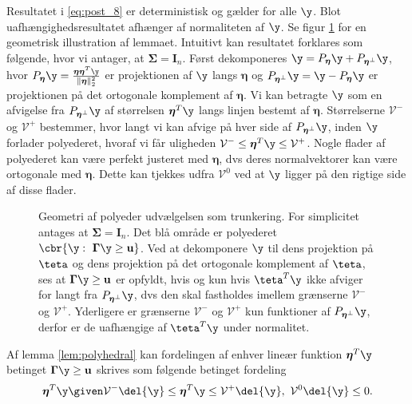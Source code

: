 %
Resultatet i \eqref{eq:post_8} er deterministisk og gælder for alle \(\y\).
Blot uafhængighedsresultatet afhænger af normaliteten af \(\y\).
Se figur \ref{fig:polyhedron} for en geometrisk illustration af lemmaet.
Intuitivt kan resultatet forklares som følgende, hvor vi antager, at \(\boldsymbol{\Sigma}= \mathbf{I}_n\).
Først dekomponeres \(\y=P_{\boldsymbol{\eta}} \y + P_{\boldsymbol{\eta}^\perp} \y\), hvor \(P_{\boldsymbol{\eta}} \y = \frac{\boldsymbol{\eta} \boldsymbol{\eta}^T \y}{\Vert \boldsymbol{\eta} \Vert_2^2}\) er projektionen af \(\y\) langs \(\boldsymbol{\eta}\) og \(P_{\boldsymbol{\eta}^\perp} \y = \y - P_{\boldsymbol{\eta}} \y\) er projektionen på det ortogonale komplement af \(\boldsymbol{\eta}\).
Vi kan betragte \(\y\) som en afvigelse fra \(P_{\boldsymbol{\eta}^\perp} \y\) af størrelsen \(\boldsymbol{\eta}^T \y\) langs linjen bestemt af \(\boldsymbol{\eta}\).
Størrelserne \(\mathcal{V}^-\) og \(\mathcal{V}^+\) bestemmer, hvor langt vi kan afvige på hver side af \(P_{\boldsymbol{\eta}^\perp} \y\), inden \(\y\) forlader polyederet, hvoraf vi får uligheden \(\mathcal{V}^- \leq \boldsymbol{\eta}^T \y \leq \mathcal{V}^+\).
Nogle flader af polyederet kan være perfekt justeret med \(\boldsymbol{\eta}\), dvs deres normalvektorer kan være ortogonale med \(\boldsymbol{\eta}\).
Dette kan tjekkes udfra \(\mathcal{V}^0\) ved at \(\y\) ligger på den rigtige side af disse flader.  
%
\begin{figure}[H]
\centering
\scalebox{1}{}
\caption{Geometri af polyeder udvælgelsen som trunkering. For simplicitet antages at \(\boldsymbol{\Sigma} = \mathbf{I}_n\). Det blå område er polyederet \(\cbr{\y : \ \boldsymbol{\Gamma} \y \geq \mathbf{u}}\).
Ved at dekomponere \(\y\) til dens projektion på \(\teta\) og dens projektion på det ortogonale komplement af \(\teta\), ses at \(\boldsymbol{\Gamma} \y \geq \mathbf{u}\) er opfyldt, hvis og kun hvis \(\teta^T \y\) ikke afviger for langt fra \(P_{\boldsymbol{\eta}^\perp} \y\), dvs den skal fastholdes imellem grænserne \(\mathcal{V}^-\) og \(\mathcal{V}^+\).
Yderligere er grænserne \(\mathcal{V}^-\) og \(\mathcal{V}^+\) kun funktioner af \(P_{\boldsymbol{\eta}^\perp} \y\), derfor er de uafhængige af \(\teta^T \y\) under normalitet.} \label{fig:polyhedron}
\end{figure}
%
Af lemma \ref{lem:polyhedral} kan fordelingen af enhver lineær funktion \(\boldsymbol{\eta}^T \y\) betinget \(\boldsymbol{\Gamma} \y \geq \mathbf{u}\) skrives som følgende betinget fordeling
\begin{align*}
\boldsymbol{\eta}^T \y \given \mathcal{V}^- \del{\y} \leq \boldsymbol{\eta}^T \y \leq \mathcal{V}^+ \del{\y}, \ \mathcal{V}^0 \del{\y} \leq 0.
\end{align*}
